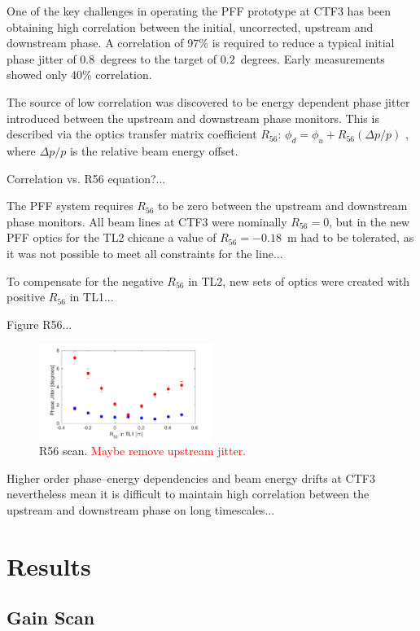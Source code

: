 \documentclass[%
 reprint,
 amsmath,amssymb,
 aps,
]{revtex4-1}
\begin{document}
One of the key challenges in operating the PFF prototype at CTF3 has been 
obtaining high correlation between the initial, uncorrected, upstream and 
downstream phase. A correlation of 97\% is required to reduce a typical initial 
phase jitter of \(0.8\)~degrees to the target of \(0.2\)~degrees. Early 
measurements showed only 40\% correlation.

The source of low correlation was discovered to be energy dependent phase 
jitter introduced between the upstream and downstream phase monitors. This is 
described via the optics transfer matrix coefficient \(R_{56}\):
\(\phi_d = \phi_u + R_{56}(\Delta p / p)\)
, where \(\Delta p / p\) is the relative beam energy offset.

Correlation vs. R56 equation?...

The PFF system requires \(R_{56}\) to be zero between the upstream and 
downstream phase monitors. All beam lines at CTF3 were nominally \(R_{56}=0\), 
but in the new PFF optics for the TL2 chicane a value of \(R_{56}=-0.18\)~m had 
to be tolerated, as it was not possible to meet all constraints for the line...

To compensate for the negative \(R_{56}\) in TL2, new sets of optics were 
created with positive \(R_{56}\) in TL1...

Figure R56...

\begin{figure}
	\includegraphics[width=0.5\textwidth]{figs/r56Scan}%
	\caption{\label{fig:r56Scan}R56 scan. \textcolor{red}{Maybe remove 
	upstream jitter.}}
\end{figure}


Higher order phase--energy dependencies and beam energy drifts at CTF3 
nevertheless mean it is difficult to maintain high correlation between the 
upstream and downstream phase on long timescales...

\section{\label{s:results}Results}

\subsection{\label{ss:gScan}Gain Scan}
\end{document}
